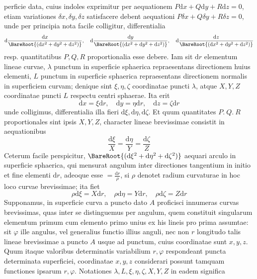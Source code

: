 %
perficie data, cuius indoles exprimitur per aequationem \(P\mathrm{d}x+Q\mathrm{d}y+R\mathrm{d}z=0\), etiam variationes \(\delta x,\delta y,\delta z\) satisfacere debent aequationi \(P\delta x+Q\delta y+R\delta z=0\), unde per principia nota facile colligitur, differentialia
\[
\mathrm{d}\frac{\mathrm{d}x}{\BareRoot{(\mathrm{d}x^2+\mathrm{d}y^2+\mathrm{d}z^2)}},\quad
\mathrm{d}\frac{\mathrm{d}y}{\BareRoot{(\mathrm{d}x^2+\mathrm{d}y^2+\mathrm{d}z^2)}},\quad
\mathrm{d}\frac{\mathrm{d}z}{\BareRoot{(\mathrm{d}x^2+\mathrm{d}y^2+\mathrm{d}z^2)}}
\]
resp. quantitatibus \(P,Q,R\) proportionalia esse debere. Iam sit \(\mathrm{d}r\) elementum lineae curvae, \(\lambda\) punctum in superficie sphaerica repraesentans directionem huius elementi, \(L\) punctum in superficie sphaerica repraesentans directionem normalis in superficiem curvam; denique sint \(\xi,\eta,\zeta\) coordinatae puncti \(\lambda\), atque \(X,Y,Z\) coordinatae puncti \(L\) respectu centri sphaerae. Ita erit
\[
\mathrm{d}x=\xi\mathrm{d}r,\quad\mathrm{d}y=\eta\mathrm{d}r,\quad\mathrm{d}z=\zeta\mathrm{d}r
\]
unde colligimus, differentialia illa fieri \(\mathrm{d}\xi,\mathrm{d}\eta,\mathrm{d}\zeta\). Et quum quantitates \(P\mathord{.}\ Q\mathord{.}\ R\) proportionales sint ipsis \(X,Y,Z\), character lineae brevissimae consistit in aequationibus
\[
\frac{\mathrm{d}\xi}{X}=\frac{\mathrm{d}\eta}{Y}=\frac{\mathrm{d}\zeta}{Z}
\]
Ceterum facile perspicitur, \(\BareRoot{(\mathrm{d}\xi^2+\mathrm{d}\eta^2+\mathrm{d}\zeta^2)}\) aequari arculo in superficie sphaerica, qui mensurat angulum inter directiones tangentium in initio et fine elementi \(\mathrm{d}r\), adeoque esse \(=\frac{\mathrm{d}r}{\rho}\), si \(\rho\) denotet radium curvaturae in hoc loco curvae brevissimae; ita fiet
\[
\rho\mathrm{d}\xi=X\mathrm{d}r,\quad\rho\mathrm{d}\eta=Y\mathrm{d}r,\quad\rho\mathrm{d}\zeta=Z\mathrm{d}r
\]
Supponamus, in superficie curva a puncto dato \(A\) proficisci innumeras curvas brevissimas, quas inter se distinguemus per angulum, quem constituit singularum elementum primum cum elemento primo unius ex his lineis pro prima assumtae: sit \(\varphi\) ille angulus, vel generalius functio illius anguli, nec non \(r\) longitudo talis lineae brevissimae a puncto \(A\) usque ad punctum, cuius coordinatae sunt \(x,y,z\). Quum itaque valoribus determinatis variabilium \(r,\varphi\) respondeant puncta determinata superficiei, coordinatae \(x,y,z\) considerari possunt tamquam functiones ipsarum \(r,\varphi\). Notationes \(\lambda,L,\xi,\eta,\zeta,X,Y,Z\) in eadem significa%
